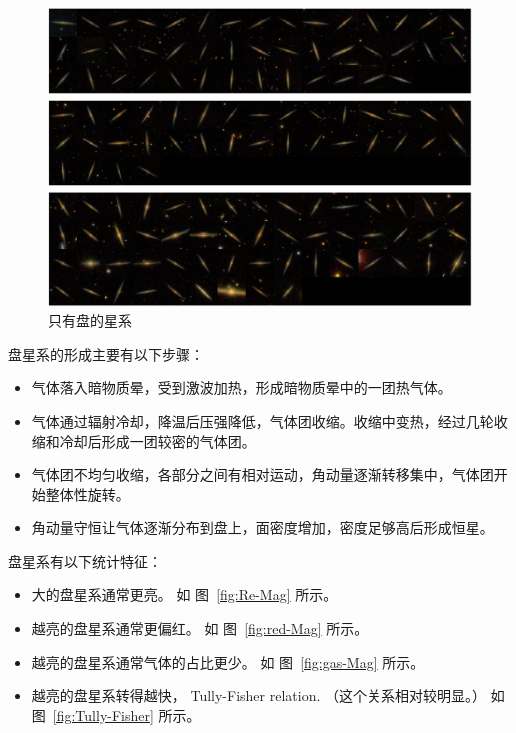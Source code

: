 \documentclass[12pt]{ctexart}
\newcommand{\reffig}[1]{图~\ref{#1}}
\begin{document}
\begin{figure}[!hbtp]
	\centering 
	\includegraphics[width=1.0\linewidth]{pure_disk.png}
	\caption{只有盘的星系}
    \label{fig:pure-disk}
\end{figure}

盘星系的形成主要有以下步骤：
\begin{itemize}
    \item 气体落入暗物质晕，受到激波加热，形成暗物质晕中的一团热气体。
    \item 气体通过辐射冷却，降温后压强降低，气体团收缩。收缩中变热，经过几轮收缩和冷却后形成一团较密的气体团。
    \item 气体团不均匀收缩，各部分之间有相对运动，角动量逐渐转移集中，气体团开始整体性旋转。
    \item 角动量守恒让气体逐渐分布到盘上，面密度增加，密度足够高后形成恒星。
\end{itemize}

盘星系有以下统计特征：
\begin{itemize}
    \item 大的盘星系通常更亮。 如 \reffig{fig:Re-Mag} 所示。
    \item 越亮的盘星系通常更偏红。 如 \reffig{fig:red-Mag} 所示。
    \item 越亮的盘星系通常气体的占比更少。 如 \reffig{fig:gas-Mag} 所示。
    \item 越亮的盘星系转得越快， Tully-Fisher relation. （这个关系相对较明显。） 如 \reffig{fig:Tully-Fisher} 所示。
\end{itemize}
\end{document}
